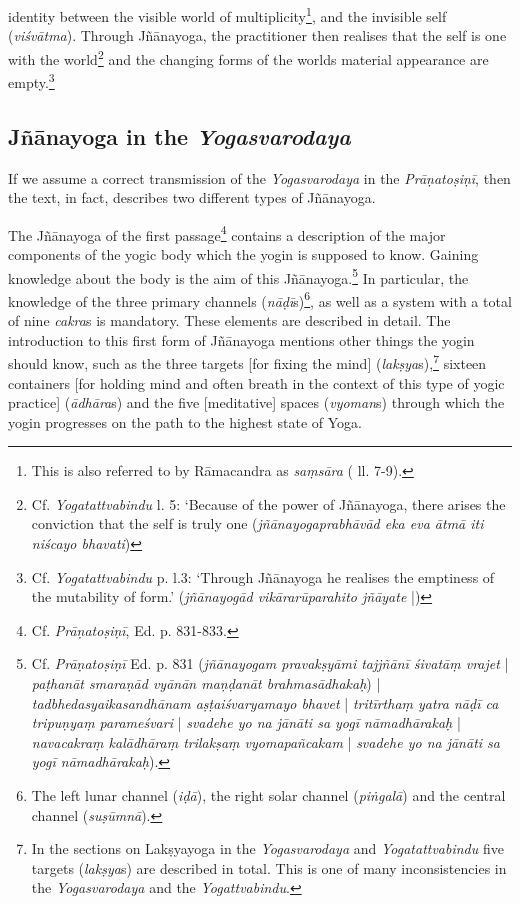 identity between the visible world of multiplicity\footnote{This is also referred to by Rāmacandra as \textit{saṃsāra} ( ll. 7-9).}, and the invisible self (\textit{viśvātma}). Through Jñānayoga, the practitioner then realises that the self is one with the world\footnote{Cf. \textit{Yogatattvabindu}  \pageref{svabhava1} l. 5: `Because of the power of Jñānayoga, there arises the conviction that the self is truly one (\textit{jñānayogaprabhāvād eka eva ātmā iti niścayo bhavati})} and the changing forms of the worlds material appearance are empty.\footnote{Cf. \textit{Yogatattvabindu}  p.\pageref{svabhava2} l.3: `Through Jñānayoga he realises the emptiness of the mutability of form.' (\textit{jñānayogād vikārarūparahito jñāyate} |)}

\subsection{Jñānayoga in the \textit{Yogasvarodaya}}
\label{svarodayajnana}
If we assume a correct transmission of the \textit{Yogasvarodaya} in the \textit{Prāṇatoṣiṇī}, then the text, in fact, describes two different types of Jñānayoga. 

The Jñānayoga of the first passage\footnote{Cf. \textit{Prāṇatoṣiṇī}, Ed. p. 831-833.} contains a description of the major components of the yogic body which the yogin is supposed to know. Gaining knowledge about the body is the aim of this Jñānayoga.\footnote{Cf. \textit{Prāṇatoṣiṇī} Ed. p. 831 (\textit{jñānayogam pravakṣyāmi tajjñānī śivatāṃ vrajet} | \textit{paṭhanāt smaraṇād vyānān maṇḍanāt brahmasādhakaḥ}) | \textit{tadbhedasyaikasandhānam aṣṭaiśvaryamayo bhavet} | \textit{tritīrthaṃ yatra nāḍī ca tripuṇyaṃ parameśvari} | \textit{svadehe yo na jānāti sa yogī nāmadhārakaḥ} | \textit{navacakraṃ kalādhāraṃ trilakṣaṃ vyomapañcakam} | \textit{svadehe yo na jānāti sa yogī nāmadhārakaḥ}).} In particular, the knowledge of the three primary channels (\textit{nāḍī}s)\footnote{The left lunar channel (\textit{iḍā}), the right solar channel (\textit{piṅgalā}) and the central channel (\textit{suṣūmnā}).}, as well as a system with a total of nine \textit{cakra}s is mandatory. These elements are described in detail. The introduction to this first form of Jñānayoga mentions other things the yogin should know, such as the three targets [for fixing the mind] (\textit{lakṣya}s),\footnote{In the sections on Lakṣyayoga in the \textit{Yogasvarodaya} and \textit{Yogatattvabindu} five targets (\textit{lakṣya}s) are described in total. This is one of many inconsistencies in the \textit{Yogasvarodaya} and the \textit{Yogattvabindu}.} sixteen containers [for holding mind and often breath in the context of this type of yogic practice] (\textit{ādhāra}s) and the five [meditative] spaces (\textit{vyoman}s) through which the yogin progresses on the path to the highest state of Yoga. 


